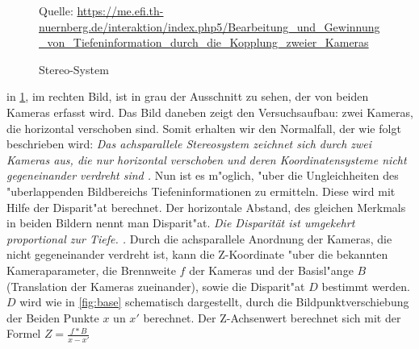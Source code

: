 \begin{figure}%
	\centering
	\qquad
	\caption{Stereo-System}%
	\small Quelle: \url{https://me.efi.th-nuernberg.de/interaktion/index.php5/Bearbeitung_und_Gewinnung_von_Tiefeninformation_durch_die_Kopplung_zweier_Kameras}
	\label{fig:stereo}%
\end{figure}

\noindent in \ref{fig:stereo}, im rechten Bild, ist in grau der Ausschnitt zu sehen, der von beiden Kameras erfasst wird. Das Bild daneben zeigt den Versuchsaufbau: zwei Kameras, die horizontal verschoben sind. Somit erhalten wir den Normalfall, der wie folgt beschrieben wird: \textit{Das achsparallele Stereosystem zeichnet sich durch zwei Kameras aus, die nur horizontal verschoben und deren Koordinatensysteme nicht gegeneinander verdreht sind \cite{Tu}.}\newline
\noindent Nun ist es m"oglich, "uber die Ungleichheiten des "uberlappenden Bildbereichs Tiefeninformationen zu ermitteln. Diese wird mit Hilfe der Disparit"at berechnet.\newline
Der horizontale Abstand, des gleichen Merkmals in beiden Bildern nennt man Disparit"at. \textit{Die Disparität ist umgekehrt proportional zur Tiefe. \cite{Tu}.}\newline
Durch die achsparallele Anordnung der Kameras, die nicht gegeneinander verdreht ist, kann die Z-Koordinate "uber die bekannten Kameraparameter, die Brennweite $f$ der Kameras und der Basisl"ange $B$ (Translation der Kameras zueinander), sowie die Disparit"at $D$ bestimmt werden. $D$ wird wie in \ref{fig:base} schematisch dargestellt, durch die Bildpunktverschiebung der Beiden Punkte $x$ un $x'$ berechnet. Der Z-Achsenwert berechnet sich mit der Formel $Z=\frac{f*B}{x-x'}$
 
